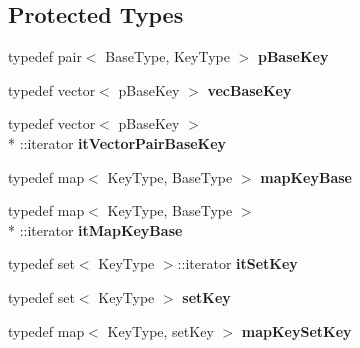 \subsection*{Protected Types}
\begin{DoxyCompactItemize}
\item 
\hypertarget{classMultiBoost_1_1Exp3GLS_a3abfa9d81028af38ccc77c94e7ead119}{typedef pair$<$ Base\-Type, Key\-Type $>$ {\bfseries p\-Base\-Key}}\label{classMultiBoost_1_1Exp3GLS_a3abfa9d81028af38ccc77c94e7ead119}

\item 
\hypertarget{classMultiBoost_1_1Exp3GLS_ac8438536c093e9198e6ddd99966dee11}{typedef vector$<$ p\-Base\-Key $>$ {\bfseries vec\-Base\-Key}}\label{classMultiBoost_1_1Exp3GLS_ac8438536c093e9198e6ddd99966dee11}

\item 
\hypertarget{classMultiBoost_1_1Exp3GLS_a90682a64c88412b1b4ab1bfc19ea8961}{typedef vector$<$ p\-Base\-Key $>$\\*
\-::iterator {\bfseries it\-Vector\-Pair\-Base\-Key}}\label{classMultiBoost_1_1Exp3GLS_a90682a64c88412b1b4ab1bfc19ea8961}

\item 
\hypertarget{classMultiBoost_1_1Exp3GLS_a59a624841ce47f5caa85549fabb3818e}{typedef map$<$ Key\-Type, Base\-Type $>$ {\bfseries map\-Key\-Base}}\label{classMultiBoost_1_1Exp3GLS_a59a624841ce47f5caa85549fabb3818e}

\item 
\hypertarget{classMultiBoost_1_1Exp3GLS_a8857d4c8f5b146d211859b8e918dfe63}{typedef map$<$ Key\-Type, Base\-Type $>$\\*
\-::iterator {\bfseries it\-Map\-Key\-Base}}\label{classMultiBoost_1_1Exp3GLS_a8857d4c8f5b146d211859b8e918dfe63}

\item 
\hypertarget{classMultiBoost_1_1Exp3GLS_ab490c29d87d3c87b3faeef5192a9dfbb}{typedef set$<$ Key\-Type $>$\-::iterator {\bfseries it\-Set\-Key}}\label{classMultiBoost_1_1Exp3GLS_ab490c29d87d3c87b3faeef5192a9dfbb}

\item 
\hypertarget{classMultiBoost_1_1Exp3GLS_a3ce77164624293b4eab5b8bc13db395f}{typedef set$<$ Key\-Type $>$ {\bfseries set\-Key}}\label{classMultiBoost_1_1Exp3GLS_a3ce77164624293b4eab5b8bc13db395f}

\item 
\hypertarget{classMultiBoost_1_1Exp3GLS_a481df1b39db9b7aebf0cf6f3df497b2a}{typedef map$<$ Key\-Type, set\-Key $>$ {\bfseries map\-Key\-Set\-Key}}\label{classMultiBoost_1_1Exp3GLS_a481df1b39db9b7aebf0cf6f3df497b2a}


\end{DoxyCompactItemize}
